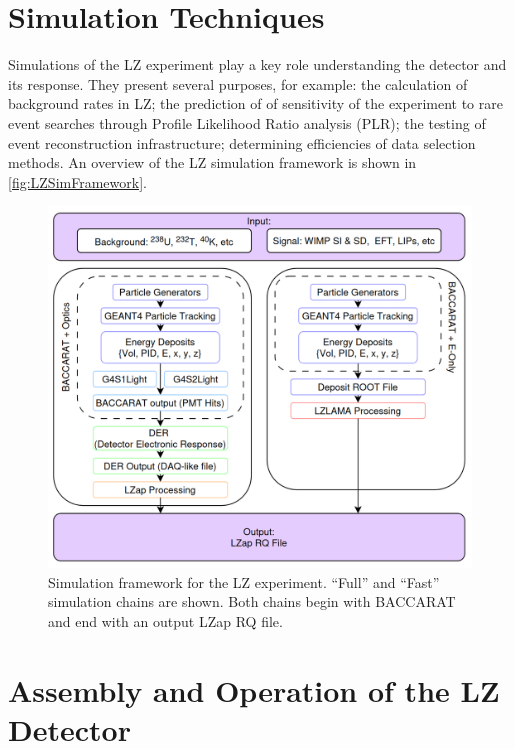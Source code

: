\section{Simulation Techniques}
Simulations of the LZ experiment play a key role understanding the detector and its response. They present several purposes, for example: the calculation of background rates in LZ; the prediction of of sensitivity of the experiment to rare event searches through Profile Likelihood Ratio analysis (PLR); the testing of event reconstruction infrastructure; determining efficiencies of data selection methods. An overview of the LZ simulation framework is shown in \autoref{fig:LZSimFramework}.
\begin{figure}[h!]
    \centering
    \includegraphics[width=\linewidth]{figures/LZ/LZSimFramework.png}
    \caption{Simulation framework for the LZ experiment. ``Full'' and ``Fast'' simulation chains are shown. Both chains begin with BACCARAT and end with an output LZap RQ file.}
    \label{fig:LZSimFramework}
\end{figure}

\section{Assembly and Operation of the LZ Detector}